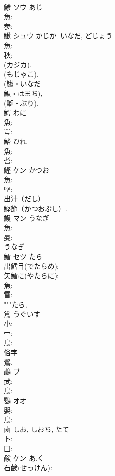 \documentclass[8pt]{extreport}
\begin{document}
\begin{CJK}{UTF8}{min}
\\	鯵	ソウ	あじ		
\\	魚: 
\\	参: 
\\	鰍	シュウ	かじか, いなだ, どじょう		
\\	魚: 
\\	秋: 
\\	(カジカ). 
\\	(もじゃこ), 
\\	(鰍・いなだ 
\\	魬・はまち), 
\\	(鰤・ぶり). 
\\	鰐		わに				
\\	魚: 
\\	咢: 
\\	鰭		ひれ				
\\	魚: 
\\	耆: 
\\	鰹	ケン	かつお		
\\	魚: 
\\	堅: 
\\	出汁（だし） 
\\	鰹節（かつおぶし）.	
\\	鰻	マン	うなぎ		
\\	魚: 
\\	曼: 
\\	うなぎ 
\\	鱈	セツ	たら		
\\	出鱈目(でたらめ): 
\\	矢鱈に(やたらに): 
\\	魚: 
\\	雪: 
\\	"""たら, 
\\	鴬		うぐいす				
\\	小: 
\\	冖: 
\\	鳥: 
\\	俗字 
\\	鶯. 
\\	鵡	ブ			
\\	武: 
\\	鳥: 
\\	鸚	オオ			
\\	嬰: 
\\	鳥: 
\\	鹵		しお, しおち, たて				
\\	卜: 
\\	囗: 
\\	鹸	ケン	あ.く		
\\	石鹸(せっけん): 

\end{CJK}
\end{document}

